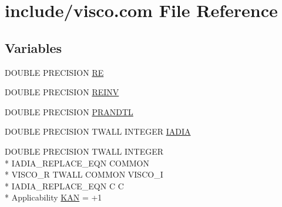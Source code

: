 \hypertarget{home_2abonfi_2_c_f_d__codes_2_eul_f_s_83_84_2include_2visco_8com}{\section{include/visco.com File Reference}
\label{home_2abonfi_2_c_f_d__codes_2_eul_f_s_83_84_2include_2visco_8com}
}
\subsection*{Variables}
\begin{DoxyCompactItemize}
\item 
D\-O\-U\-B\-L\-E P\-R\-E\-C\-I\-S\-I\-O\-N \hyperlink{home_2abonfi_2_c_f_d__codes_2_eul_f_s_83_84_2include_2visco_8com_acee3bf3b2f2eee0ca24fa7fcea80bf5e}{R\-E}
\item 
D\-O\-U\-B\-L\-E P\-R\-E\-C\-I\-S\-I\-O\-N \hyperlink{home_2abonfi_2_c_f_d__codes_2_eul_f_s_83_84_2include_2visco_8com_a572d2eabf094e0bf11921a66d45a36b2}{R\-E\-I\-N\-V}
\item 
D\-O\-U\-B\-L\-E P\-R\-E\-C\-I\-S\-I\-O\-N \hyperlink{home_2abonfi_2_c_f_d__codes_2_eul_f_s_83_84_2include_2visco_8com_a230c5bd89486988c1c250f8d67ed6266}{P\-R\-A\-N\-D\-T\-L}
\item 
D\-O\-U\-B\-L\-E P\-R\-E\-C\-I\-S\-I\-O\-N T\-W\-A\-L\-L I\-N\-T\-E\-G\-E\-R \hyperlink{home_2abonfi_2_c_f_d__codes_2_eul_f_s_83_84_2include_2visco_8com_aac6f06569f9c01d0b51c03f107eb2693}{I\-A\-D\-I\-A}
\item 
D\-O\-U\-B\-L\-E P\-R\-E\-C\-I\-S\-I\-O\-N T\-W\-A\-L\-L I\-N\-T\-E\-G\-E\-R \\*
I\-A\-D\-I\-A\-\_\-\-R\-E\-P\-L\-A\-C\-E\-\_\-\-E\-Q\-N C\-O\-M\-M\-O\-N \\*
V\-I\-S\-C\-O\-\_\-\-R T\-W\-A\-L\-L C\-O\-M\-M\-O\-N V\-I\-S\-C\-O\-\_\-\-I \\*
I\-A\-D\-I\-A\-\_\-\-R\-E\-P\-L\-A\-C\-E\-\_\-\-E\-Q\-N C C \\*
Applicability \hyperlink{home_2abonfi_2_c_f_d__codes_2_eul_f_s_83_84_2include_2visco_8com_a5f14ddc0c5ad4e7f0d7ed332eeafbbcb}{K\-A\-N} = +1
\end{DoxyCompactItemize}


